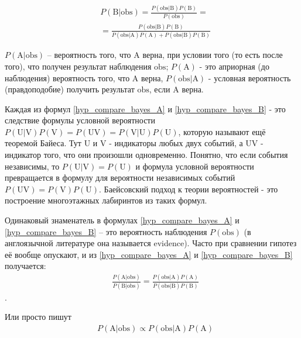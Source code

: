 \documentclass{book}
\begin{document}
\begin{align}\label{hyp_compare_bayes_B}
   &P\left(\text{B|obs}\right)=
   \frac{P\left(\text{obs|B}\right) P\left(\text{B}\right)}{P\left(\text{obs}\right)} = \nonumber \\
   &=\frac{P\left(\text{obs|B}\right) P\left(\text{B}\right)}{P\left(\text{obs|A}\right) P\left(\text{A}\right)+P\left(\text{obs|B}\right) P\left(\text{B}\right)}
\end{align}


$P\left(\text{A|obs}\right)$ -- вероятность того, что $\text{A}$ верна, при условии того (то есть после того), что получен результат наблюдения $\text{obs}$; $P\left(\text{A}\right)$ - это априорная (до наблюдения) вероятность того, что $\text{A}$ верна, $P\left(\text{obs|A}\right)$ - условная вероятность (правдоподобие) получить результат $\text{obs}$, если $\text{A}$ верна. 

Каждая из формул \eqref{hyp_compare_bayes_A} и \eqref{hyp_compare_bayes_B} - это следствие формулы условной вероятности
$\label{bayes}
P\left(\text{U|V}\right)P\left(\text{V}\right)=P\left(\text{UV}\right)=P\left(\text{V|U}\right)P\left(\text{U}\right)
$, которую называют ещё теоремой Байеса. Тут U и V - индикаторы любых двух событий, а UV - индикатор того, что они произошли одновременно. Понятно, что если события независимы, то $P\left(\text{U|V}\right)=P\left(\text{U}\right)$ и формула условной вероятности превращается в формулу для вероятности независимых событий $P\left(\text{UV}\right)=P\left(\text{V}\right)P\left(\text{U}\right)$. Баейсовский подход к теории вероятностей - это построение многоэтажных лабиринтов из таких формул.

Одинаковый знаменатель в формулах \eqref{hyp_compare_bayes_A} и \eqref{hyp_compare_bayes_B} -- это вероятность наблюдения $P\left(\text{obs}\right)$ (в англоязычной литературе она называется evidence). Часто при сравнении гипотез её вообще опускают, и из \eqref{hyp_compare_bayes_A} и \eqref{hyp_compare_bayes_B} получается:
\begin{align*}\label{hyp_compare_bayes_comp}
   &\frac{P\left(\text{A|obs}\right)}{P\left(\text{B|obs}\right)}=\frac{P\left(\text{obs|A}\right) P\left(\text{A}\right)}{P\left(\text{obs|B}\right) P\left(\text{B}\right)}
\end{align*}.

Или просто пишут 
\begin{align*}\label{hyp_compare_bayes_null_prop}
   &P\left(\text{A|obs}\right)\propto P\left(\text{obs|A}\right) P\left(\text{A}\right)
\end{align*}
\end{document}
